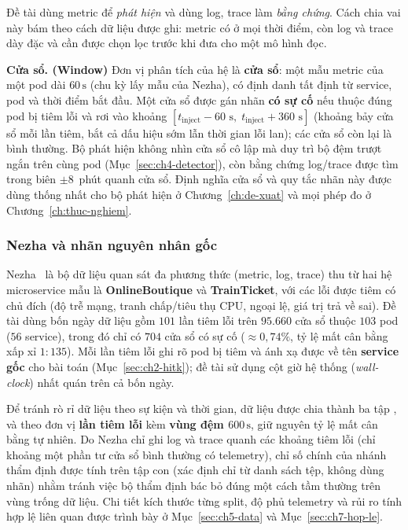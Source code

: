 Đề tài dùng metric để \emph{phát hiện} và dùng log, trace làm \emph{bằng chứng}. Cách chia vai này bám theo cách dữ liệu được ghi: metric có ở mọi thời điểm, còn log và trace dày đặc và cần được chọn lọc trước khi đưa cho một mô hình đọc.

\textbf{Cửa sổ. (Window)} Đơn vị phân tích của hệ là \textbf{cửa sổ}: một mẫu metric của một pod dài $60\,\text{s}$ (chu kỳ lấy mẫu của Nezha), có định danh tất định từ service, pod và thời điểm bắt đầu. Một cửa sổ được gán nhãn \textbf{có sự cố} nếu thuộc đúng pod bị tiêm lỗi và rơi vào khoảng $[t_{\mathrm{inject}} - 60\text{ s},\; t_{\mathrm{inject}} + 360\text{ s}]$ (khoảng bảy cửa sổ mỗi lần tiêm, bắt cả dấu hiệu sớm lẫn thời gian lỗi lan); các cửa sổ còn lại là bình thường. Bộ phát hiện không nhìn cửa sổ cô lập mà duy trì bộ đệm trượt ngắn trên cùng pod (Mục~\ref{sec:ch4-detector}), còn bằng chứng log/trace được tìm trong biên $\pm 8$~phút quanh cửa sổ. Định nghĩa cửa sổ và quy tắc nhãn này được dùng thống nhất cho bộ phát hiện ở Chương~\ref{ch:de-xuat} và mọi phép đo ở Chương~\ref{ch:thuc-nghiem}.

\subsubsection{Nezha và nhãn nguyên nhân gốc}
\label{sec:ch2-nezha}

Nezha~\cite{nezha} là bộ dữ liệu quan sát đa phương thức (metric, log, trace) thu từ hai hệ microservice mẫu là \textbf{OnlineBoutique} và \textbf{TrainTicket}, với các lỗi được tiêm có chủ đích (độ trễ mạng, tranh chấp/tiêu thụ CPU, ngoại lệ, giá trị trả về sai). Đề tài dùng bốn ngày dữ liệu gồm $101$ lần tiêm lỗi trên $95.660$ cửa sổ thuộc $103$ pod ($56$ service), trong đó chỉ có $704$ cửa sổ có sự cố ($\approx 0{,}74\%$, tỷ lệ mất cân bằng xấp xỉ $1:135$). Mỗi lần tiêm lỗi ghi rõ pod bị tiêm và ánh xạ được về tên \textbf{service gốc} cho bài toán  (Mục~\ref{sec:ch2-hitk}); đề tài sử dụng cột giờ hệ thống (\emph{wall-clock}) nhất quán trên cả bốn ngày.

Để tránh rò rỉ dữ liệu theo sự kiện và thời gian, dữ liệu được chia thành ba tập ,  và  theo đơn vị \textbf{lần tiêm lỗi} kèm \textbf{vùng đệm $600\,\text{s}$}, giữ nguyên tỷ lệ mất cân bằng tự nhiên. Do Nezha chỉ ghi log và trace quanh các khoảng tiêm lỗi (chỉ khoảng một phần tư cửa sổ bình thường có telemetry), chỉ số chính của nhánh thẩm định được tính trên tập con \textbf{} (xác định chỉ từ danh sách tệp, không dùng nhãn) nhằm tránh việc bộ thẩm định bác bỏ đúng một cách tầm thường trên vùng trống dữ liệu. Chi tiết kích thước từng split, độ phủ telemetry và rủi ro tính hợp lệ liên quan được trình bày ở Mục~\ref{sec:ch5-data} và Mục~\ref{sec:ch7-hop-le}.

